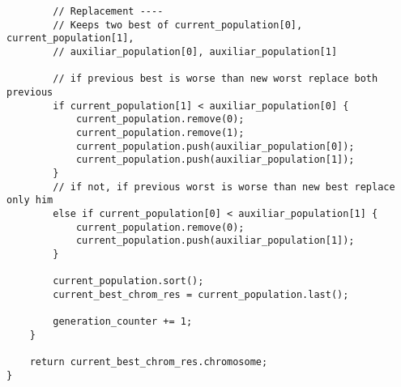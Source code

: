 \documentclass[size=a4, parskip=half, titlepage=false, toc=flat, toc=bib, 12pt]{scrartcl}
\begin{document}
\begin{verbatim}
        // Replacement ----
        // Keeps two best of current_population[0], current_population[1],
        // auxiliar_population[0], auxiliar_population[1]

        // if previous best is worse than new worst replace both previous
        if current_population[1] < auxiliar_population[0] {
            current_population.remove(0);
            current_population.remove(1);
            current_population.push(auxiliar_population[0]);
            current_population.push(auxiliar_population[1]);
        }
        // if not, if previous worst is worse than new best replace only him
        else if current_population[0] < auxiliar_population[1] {
            current_population.remove(0);
            current_population.push(auxiliar_population[1]);
        }

        current_population.sort();
        current_best_chrom_res = current_population.last();

        generation_counter += 1;
    }

    return current_best_chrom_res.chromosome;
}

\end{verbatim}
\end{document}
